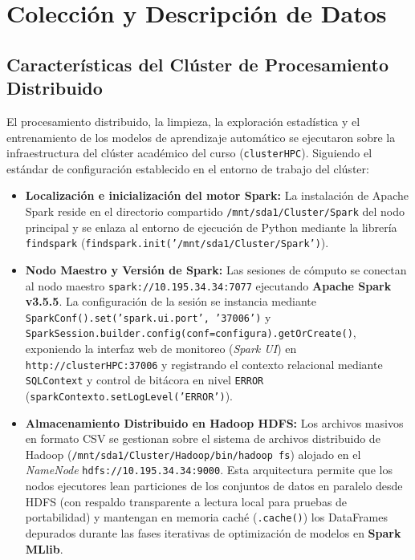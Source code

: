 \documentclass[11pt,a4paper]{article}
\begin{document}
\section{Colección y Descripción de Datos}
\label{sec:coleccion_descripcion}

\subsection{Características del Clúster de Procesamiento Distribuido}
\label{subsec:caracteristicas_cluster}

El procesamiento distribuido, la limpieza, la exploración estadística y el entrenamiento de los modelos de aprendizaje automático se ejecutaron sobre la infraestructura del clúster académico del curso (\texttt{clusterHPC}). Siguiendo el estándar de configuración establecido en el entorno de trabajo del clúster:

\begin{itemize}
    \item \textbf{Localización e inicialización del motor Spark:} La instalación de Apache Spark reside en el directorio compartido \texttt{/mnt/sda1/Cluster/Spark} del nodo principal y se enlaza al entorno de ejecución de Python mediante la librería \texttt{findspark} (\texttt{findspark.init('/mnt/sda1/Cluster/Spark')}).
    \item \textbf{Nodo Maestro y Versión de Spark:} Las sesiones de cómputo se conectan al nodo maestro \texttt{spark://10.195.34.34:7077} ejecutando \textbf{Apache Spark v3.5.5}. La configuración de la sesión se instancia mediante \texttt{SparkConf().set('spark.ui.port', '37006')} y \texttt{SparkSession.\allowbreak builder.\allowbreak config(conf=configura).\allowbreak getOrCreate()}, exponiendo la interfaz web de monitoreo (\textit{Spark UI}) en \texttt{http://clusterHPC:37006} y registrando el contexto relacional mediante \texttt{SQLContext} y control de bitácora en nivel \texttt{ERROR} (\texttt{sparkContexto.setLogLevel('ERROR')}).
    \item \textbf{Almacenamiento Distribuido en Hadoop HDFS:} Los archivos masivos en formato CSV se gestionan sobre el sistema de archivos distribuido de Hadoop (\texttt{/mnt/sda1/\allowbreak Cluster/Hadoop/\allowbreak bin/hadoop fs}) alojado en el \textit{NameNode} \texttt{hdfs://10.195.34.34:9000}. Esta arquitectura permite que los nodos ejecutores lean particiones de los conjuntos de datos en paralelo desde HDFS (con respaldo transparente a lectura local para pruebas de portabilidad) y mantengan en memoria caché (\texttt{.cache()}) los DataFrames depurados durante las fases iterativas de optimización de modelos en \textbf{Spark MLlib}.
\end{itemize}
\end{document}
